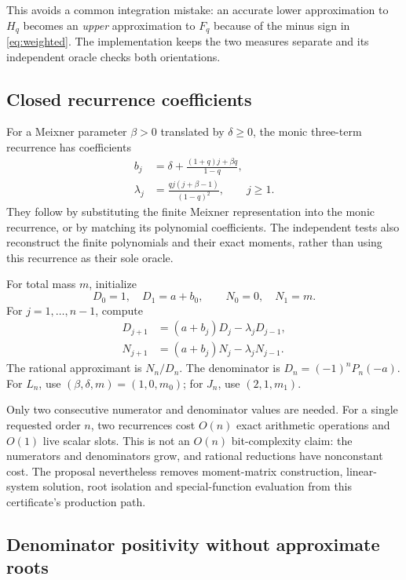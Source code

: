 \documentclass[11pt,a4paper]{article}
\theoremstyle{remark}\newtheorem{remark}[theorem]{Remark}
\begin{document}
This avoids a common integration mistake: an accurate lower approximation to
$H_q$ becomes an \emph{upper} approximation to $F_q$ because of the minus sign
in \cref{eq:weighted}. The implementation keeps the two measures separate and
its independent oracle checks both orientations.

\subsection{Closed recurrence coefficients}

For a Meixner parameter $\beta>0$ translated by $\delta\geq0$, the monic
three-term recurrence has coefficients
\begin{align}
 b_j&=\delta+\frac{(1+q)j+\beta q}{1-q},\label{eq:diagonal}\\
 \lambda_j&=\frac{qj(j+\beta-1)}{(1-q)^2},\qquad j\geq1.
 \label{eq:subdiagonal}
\end{align}
They follow by substituting the finite Meixner representation into the monic
recurrence, or by matching its polynomial coefficients. The independent tests
also reconstruct the finite polynomials and their exact moments, rather than
using this recurrence as their sole oracle.

For total mass $m$, initialize
\[
 D_0=1,\quad D_1=a+b_0,\qquad N_0=0,\quad N_1=m.
\]
For $j=1,\ldots,n-1$, compute
\begin{align}
 D_{j+1}&=(a+b_j)D_j-\lambda_jD_{j-1},\\
 N_{j+1}&=(a+b_j)N_j-\lambda_jN_{j-1}.
 \label{eq:recurrence}
\end{align}
The rational approximant is $N_n/D_n$. The denominator is
$D_n=(-1)^nP_n(-a)$. For $L_n$, use $(\beta,\delta,m)=(1,0,m_0)$;
for $J_n$, use $(2,1,m_1)$.

Only two consecutive numerator and denominator values are needed. For a
single requested order $n$, two recurrences cost $O(n)$ exact arithmetic
operations and $O(1)$ live scalar slots. This is not an $O(n)$ bit-complexity
claim: the numerators and denominators grow, and rational reductions have
nonconstant cost. The proposal nevertheless removes moment-matrix construction,
linear-system solution, root isolation and special-function evaluation from
this certificate's production path.

\subsection{Denominator positivity without approximate roots}
\end{document}
